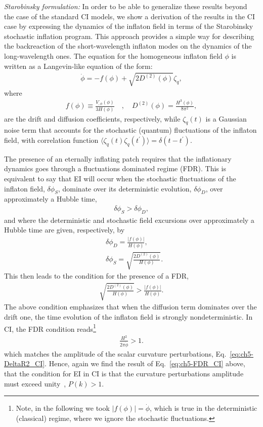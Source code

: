{\it Starobinsky formulation:} In order to be able to generalize these results  beyond the case of the standard CI models,
we show a derivation of the results in the CI case
by expressing the dynamics of the inflaton field
in terms of the Starobinsky stochastic inflation
program.  This approach provides a simple way for
describing the backreaction of the  short-wavelength inflaton modes on
the dynamics of the long-wavelength ones. The equation for the
homogeneous inflaton field $\phi$ is written as a Langevin-like
equation of the form:
%
\begin{eqnarray}
  \dot{\phi}=-f(\phi)+\sqrt{2D^{(2)}(\phi)}\zeta_q,
  \label{eq:ch5-EOM_cold}
\end{eqnarray}
%
where
%
\begin{eqnarray}
    f(\phi)\equiv \frac{V_{,\phi}(\phi)}{3H(\phi)} \quad , \quad
    D^{(2)}(\phi)=\frac{H^3(\phi)}{8\pi^2},
\end{eqnarray}
%
are the drift and diffusion coefficients, respectively, while
$\zeta_q(t)$ is a Gaussian noise term that accounts for the stochastic
(quantum) fluctuations of the inflaton field, with correlation
function
$\langle\zeta_q(t)\zeta_q(t^\prime)\rangle=\delta(t-t^\prime)$.

The presence of an eternally inflating patch requires that the inflationary dynamics goes through a fluctuations dominated regime (FDR). This is equivalent to say that EI will occur when the stochastic fluctuations of the inflaton
field, $\delta\phi_S$, dominate over its deterministic evolution,
$\delta\phi_D$, over approximately a Hubble time,
%
\begin{eqnarray}
\delta\phi_S>\delta\phi_D,
\label{eq:ch5-FDR1}
\end{eqnarray}
%
and where the deterministic and stochastic field excursions over
approximately a Hubble time are given, respectively, by
%
\begin{align}    &\delta\phi_D=\frac{|f(\phi)|}{H(\phi)},
  \label{eq:ch5-deltaphiD_C}\\
  &\delta\phi_S=\sqrt{\frac{2D^{(2)}(\phi)}{H(\phi)}}.
  \label{eq:ch5-deltaphiS_C}
\end{align}
%
This then leads to the condition for the presence of a FDR,
%
\begin{eqnarray}
 \sqrt{\frac{2D^{(2)}(\phi)}{H(\phi)}}>
 \frac{|f(\phi)|}{H(\phi)}. \label{eq:ch5-FDR}
\end{eqnarray}
%
The above condition emphasizes that when the diffusion term dominates
over the drift one, the time evolution of the inflaton field is
strongly nondeterministic.  In CI, the FDR condition
reads\footnote{Note, in the following we took $|f(\phi)|=\dot{\phi}$,
which is true in the deterministic (classical) regime, where we ignore
the stochastic fluctuations.}
%
\begin{eqnarray}
\frac{H^2}{2\pi\dot{\phi}}>1.
\end{eqnarray}
%
which matches the amplitude of the scalar curvature perturbations, Eq.~\ref{eq:ch5-DeltaR2_CI}. Hence, again we find the result of Eq.~\ref{eq:ch5-FDR_CI} above, that the condition for EI in CI is that the curvature
perturbations amplitude must exceed
unity~\cite{Goncharov:1987ir,Guth:2007ng,Kinney:2014jya},
$P (k) > 1$.


